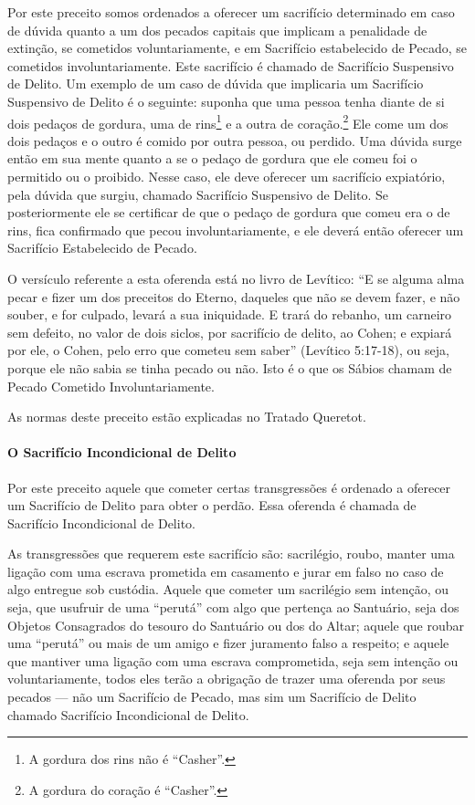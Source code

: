 Por este preceito somos ordenados a oferecer um sacrifício determinado
em caso de dúvida quanto a um dos pecados capitais que implicam a
penalidade de extinção, se cometidos voluntariamente, e em Sacrifício
estabelecido de Pecado, se cometidos involuntariamente. Este sacrifício
é chamado
de Sacrifício Suspensivo de Delito. Um exemplo de um caso de dúvida que
implicaria um Sacrifício Suspensivo de Delito é o seguinte: suponha que
uma
pessoa tenha diante de si dois pedaços de gordura, uma de rins\footnote{A gordura dos rins não é ``Casher''.}
e a outra de coração.\footnote{A gordura do coração é ``Casher''.} Ele come um dos dois pedaços
e o outro é comido por outra pessoa, ou perdido. Uma dúvida surge então
em sua mente quanto a se o pedaço de gordura que ele comeu foi o
permitido ou o proibido. Nesse caso, ele deve oferecer um sacrifício
expiatório, pela dúvida que surgiu, chamado Sacrifício Suspensivo de
Delito. Se posteriormente ele se certificar de que o pedaço de gordura
que comeu era o de rins, fica confirmado que pecou involuntariamente, e
ele deverá então oferecer um Sacrifício Estabelecido de Pecado.

O versículo referente a esta oferenda está no livro de Levítico: ``E se
alguma alma pecar e fizer um dos preceitos do Eterno, daqueles que não
se devem fazer, e não souber, e for culpado, levará a sua iniquidade. E
trará do rebanho, um carneiro sem defeito, no valor de dois siclos, por
sacrifício de delito, ao Cohen; e expiará por ele, o Cohen, pelo
erro que cometeu sem saber'' (Levítico 5:17-18), ou seja, porque ele
não sabia se tinha pecado ou não. Isto é o que os Sábios chamam de
Pecado Cometido Involuntariamente.

As normas deste preceito estão explicadas no Tratado Queretot.

\paragraph{O Sacrifício Incondicional de Delito}

Por este preceito aquele que cometer certas transgressões é ordenado a
oferecer um Sacrifício de Delito para obter o perdão. Essa oferenda é
chamada de Sacrifício Incondicional de Delito.

As transgressões que requerem este sacrifício são: sacrilégio, roubo,
manter uma ligação com uma escrava prometida em casamento e jurar em
falso no caso de algo entregue sob custódia. Aquele que cometer um
sacrilégio sem intenção, ou seja, que usufruir de uma ``perutá'' com
algo que pertença ao Santuário, seja dos Objetos Consagrados do tesouro
do Santuário ou dos do Altar; aquele que roubar uma ``perutá'' ou mais
de um amigo e fizer juramento falso a respeito; e aquele que mantiver
uma ligação com uma escrava comprometida, seja sem intenção ou
voluntariamente, todos eles terão a obrigação de trazer uma oferenda por seus pecados --- não um Sacrifício de Pecado, mas
sim um Sacrifício de Delito chamado Sacrifício Incondicional de Delito.


